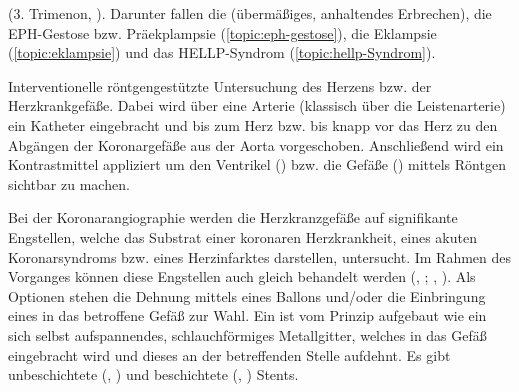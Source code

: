 \documentclass[
ngerman,
paper=a4,
asymmetric,
fontsize=10pt,
draft=false,
numbers=noenddot,
bibtotocnumbered,
footnotes=multiple,
]{scrreprt}
\begin{document}
\begin{description}
  (3. Trimenon, ). Darunter fallen die
   (übermäßiges, anhaltendes
  Erbrechen), die EPH-Gestose bzw. Präekplampsie
  (\ref{topic:eph-gestose}), die Eklampsie
  (\ref{topic:eklampsie}) und das HELLP-Syndrom
  (\ref{topic:hellp-Syndrom}).
  \item[\IX{Herzkatheteruntersuchung}]
  \label{topic:Herzkatheteruntersuchung} Interventionelle
  röntgengestützte Untersuchung des Herzens bzw. der
  Herzkrankgefäße. Dabei wird über eine Arterie
  (klassisch über die Leistenarterie) ein Katheter
  eingebracht und bis zum Herz bzw. bis knapp vor das Herz
  zu den Abgängen der Koronargefäße aus der Aorta vorgeschoben.
  Anschließend wird ein Kontrastmittel appliziert um den
  Ventrikel () bzw. die Gefäße
  () mittels Röntgen sichtbar zu
  machen.
  
  Bei der Koronarangiographie werden die Herzkranzgefäße auf
  signifikante Engstellen, welche das Substrat einer
  koronaren Herzkrankheit, eines akuten Koronarsyndroms bzw.
  eines Herzinfarktes darstellen, untersucht. Im Rahmen des
  Vorganges können diese Engstellen auch gleich behandelt
  werden (, ;
  , ).
  Als Optionen stehen die Dehnung mittels eines Ballons und/oder die Einbringung eines 
  in das betroffene Gefäß zur Wahl. Ein  ist vom
  Prinzip aufgebaut wie ein sich selbst aufspannendes,
  schlauchförmiges Metallgitter, welches in das Gefäß
  eingebracht wird und dieses an der betreffenden Stelle
  aufdehnt. Es gibt unbeschichtete (, ) und beschichtete (, ) Stents.
  

\end{description}
\end{document}
